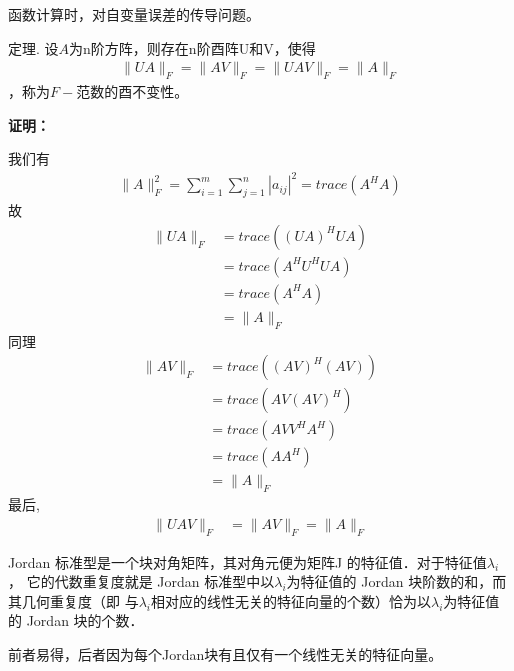 \documentclass{article}
\begin{document}
\begin{zremark}
  函数计算时，对自变量误差的传导问题。
\end{zremark}

\begin{zremark}
  定理. 设$A$为n阶方阵，则存在n阶酉阵U和V，使得
  \begin{align*}
    \|UA\|_F = \|A V\|_F = \|UAV\|_F = \|A\|_F
  \end{align*}
  ，称为$F-$范数的酉不变性。
\end{zremark}
\textbf{证明：}

我们有
\begin{align*}
  \|A\|_F^2 = \sum\limits_{i = 1}^m \sum\limits_{j = 1}^n |a_{ij}|^2 = trace(A^H A)
\end{align*}
故
\begin{align*}
  \|UA\|_F
   & = trace((UA)^H UA )  \\
   & = trace(A^H U^H U A) \\
   & = trace(A^H  A)      \\
   & = \|A\|_F
\end{align*}
同理
\begin{align*}
  \|A V\|_F
   & = trace((A V)^H (A V)) \\
   & = trace(A V (A V)^H)   \\
   & = trace(A V V^H A^H)   \\
   & = trace(A  A^H)        \\
   & = \|A\|_F
\end{align*}
最后,
\begin{align*}
  \|UAV\|_F & = \| AV\|_F = \|A\|_F
\end{align*}

\begin{zremark}
  Jordan 标准型是一个块对角矩阵，其对角元便为矩阵J 的特征值．对于特征值$\lambda_i$，
  它的代数重复度就是 Jordan 标准型中以$\lambda_i$为特征值的 Jordan 块阶数的和，而其几何重复度（即
  与$\lambda_i$相对应的线性无关的特征向量的个数）恰为以$\lambda_i$为特征值的 Jordan 块的个数．
\end{zremark}

前者易得，后者因为每个Jordan块有且仅有一个线性无关的特征向量。
\end{document}
